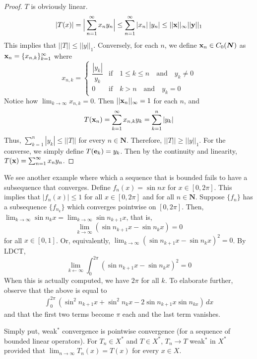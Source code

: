 \begin{proof}
$T$ is obviously linear. 
\[|T(x)|=\Big|\sum ^{\infty }_{n=1}x_{n}y_{n}\Big|\leq\sum ^{\infty }_{n=1}|x_{n}|\,|y_{n}|\leq ||{\bf x}||_{\infty }||{\bf y}||_{1}\]
This implies that $||T||\leq ||y||_{1}$. Conversely, for each $n$, we define ${\bf x}_{n}\in C_{0}({\bm N})$ as ${\bf x}_{n}=\{x_{n,k}\}_{k=1}^{\infty }$ where 
\[x_{n,k}=\begin{cases}
\dfrac{|y_{k}|}{y_{k}}&\mathrm{if}\quad 1\leq k\leq n\quad \mathrm{and}\quad y_{k}\ne 0\\
0&\mathrm{if}\quad k>n\quad \mathrm{and}\quad y_{k}= 0
\end{cases}\]
Notice how $\lim _{k\rightarrow \infty }x_{n,k}=0$. Then $||{\bf x}_{n}||_{\infty }=1$ for each $n$, and 
\[T({\bf x}_{n})=\sum ^{\infty }_{k=1}x_{n,k}y_{k}=\sum ^{n}_{k=1}|y_{k}|\]
Thus, $\sum _{k=1}^{n}|y_{k}|\leq ||T||$ for every $n\in {\bm N}$. Therefore, $||T||\geq ||y||_{1}$. For the converse, we simply define $T({\bf e}_{k})=y_{k}$. Then by the continuity and linearity, $T({\bf x})=\sum ^{\infty }_{n=1}x_{n}y_{n}$.
\end{proof}
\vspace{2ex}
\begin{ex}
We see another example where which a sequence that is bounded fails to have a subsequence that converges. Define $f_{n}(x)=\sin nx$ for $x\in [0,2\pi ]$. This implies that $|f_{n}(x)|\leq 1$ for all $x\in [0,2\pi ]$ and for all $n\in {\bm N}$. Suppose $\{f_{n}\}$ has a subsequence $\{f_{n_{k}}\}$ which converges pointwise on $[0,2\pi ]$. Then, $\lim _{k\rightarrow \infty }\sin n_{k}x=\lim _{k\rightarrow \infty }\sin n_{k+1}x$, that is,
\[\lim _{k\rightarrow \infty }(\sin n_{k+1}x-\sin n_{k}x)=0\]
for all $x\in [0,1]$. Or, equivalently, $\lim _{k\rightarrow \infty }(\sin n_{k+1}x-\sin n_{k}x)^2=0$. By LDCT, 
\[\lim _{k\leftarrow \infty }\int ^{2\pi }_{0}(\sin n_{k+1}x-\sin n_{k}x)^2=0\]
When this is actually computed, we have $2\pi $ for all $k$. To elaborate further, observe that the above is equal to 
\begin{align*}
\int ^{2\pi }_{0}(\sin ^{2}n_{k+1}x+\sin ^2n_{k}x-2\sin n_{k+1}x\sin n_{kx})\,dx
\end{align*}
and that the first two terms become $\pi $ each and the last term vanishes. 
\end{ex}
\vspace{2ex}
\begin{defi}
Simply put, weak$^{*}$ convergence is pointwise convergence (for a sequence of bounded linear operators). For $T_{n}\in X^{*}$ and $T\in X^{*}$, $T_{n}\rightarrow T$ weak$^{*}$ in $X^{*}$ provided that $\lim _{n\rightarrow \infty }T_{n}(x)=T(x)$ for every $x\in X$.
\end{defi}
